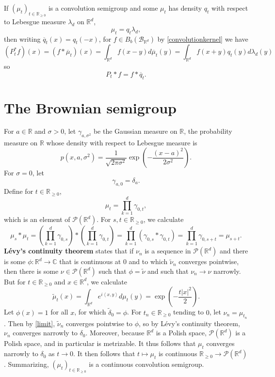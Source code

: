 \documentclass{article}
\newcommand{\inner}[2]{\left\langle #1, #2 \right\rangle}
\theoremstyle{definition}
\begin{document}
If $(\mu_t)_{t \in \mathbb{R}_{\geq 0}}$ is a convolution semigroup and
some  $\mu_t$ has density $q_t$ with respect to Lebesgue measure $\lambda_d$ on $\mathbb{R}^d$,
\[
\mu_t = q_t \lambda_d,
\]
then writing $\overline{q}_t(x) = q_t(-x)$, for $f \in B_b(\mathscr{B}_{\mathbb{R}^d})$ by \eqref{convolutionkernel} we have
\[
(P_t^*f)(x) = (f*\overline{\mu}_t)(x) = \int_{\mathbb{R}^d} f(x-y) d\overline{\mu}_t(y)
=\int_{\mathbb{R}^d} f(x+y) q_t(y) d\lambda_d(y)
\]
so
\begin{equation}
P_t*f = f*\overline{q}_t.
\label{qt}
\end{equation}

\section{The Brownian semigroup}
For $a \in \mathbb{R}$ and $\sigma>0$,
let $\gamma_{a,\sigma^2}$ be the Gaussian measure on $\mathbb{R}$, the probability measure on $\mathbb{R}$
whose density with respect to Lebesgue measure is
\[
p(x,a,\sigma^2) = \frac{1}{\sqrt{2\pi \sigma^2}} \exp\left(-\frac{(x-a)^2}{2\sigma^2}\right).
\]
For $\sigma=0$, let
\[
\gamma_{a,0} = \delta_a.
\]
Define for $t \in \mathbb{R}_{\geq 0}$,
\[
\mu_t = \prod_{k=1}^d \gamma_{0,t},
\]
which is an element of $\mathscr{P}(\mathbb{R}^d)$. 
For $s,t  \in \mathbb{R}_{\geq 0}$, we calculate
\[
\mu_s * \mu_t =  \left(\prod_{k=1}^d \gamma_{0,s}\right) * \left( \prod_{k=1}^d \gamma_{0,t} \right) 
=\prod_{k=1}^d (\gamma_{0,s} * \gamma_{0,t})
=\prod_{k=1}^d \gamma_{0,s+t}
=\mu_{s+t}.
\]
\textbf{L\'evy's continuity theorem} states that if $\nu_n$ is a sequence in $\mathscr{P}(\mathbb{R}^d)$
and there is some $\phi:\mathbb{R}^d \to \mathbb{C}$ that is continuous at $0$
and  to which $\tilde{\nu}_n$ converges pointwise, then there is some $\nu \in \mathscr{P}(\mathbb{R}^d)$ such that
$\phi = \tilde{\nu}$ and such that $\nu_n \to \nu$ narrowly.
But for $t \in \mathbb{R}_{\geq 0}$ and $x \in \mathbb{R}^d$, we calculate 
\begin{equation}
\tilde{\mu}_t(x) = \int_{\mathbb{R}^d} e^{i\inner{x}{y}} d\mu_t(y)
=\exp\left(-\frac{t|x|^2}{2}\right).
\label{limit}
\end{equation}
Let $\phi(x)=1$ for all $x$, for which $\tilde{\delta}_0=\phi$.
For $t_n \in \mathbb{R}_{\geq 0}$ tending to $0$, let
$\nu_n = \mu_{t_n}$. Then by \eqref{limit}, $\tilde{\nu}_n$ converges pointwise to $\phi$, so  by L\'evy's continuity theorem,
$\nu_n$ converges narrowly to $\delta_0$. 
Moreover, because $\mathbb{R}^d$ is a Polish space, $\mathscr{P}(\mathbb{R}^d)$ is a Polish space, and in particular
is metrizable. It thus follows that
$\mu_t$ converges narrowly to $\delta_0$ as $t \to 0$.
It then follows   that $t \mapsto \mu_t$ is continuous $\mathbb{R}_{\geq 0} \to \mathscr{P}(\mathbb{R}^d)$. 
Summarizing, $(\mu_t)_{t \in \mathbb{R}_{\geq 0}}$ is a continuous convolution semigroup.
\end{document}
